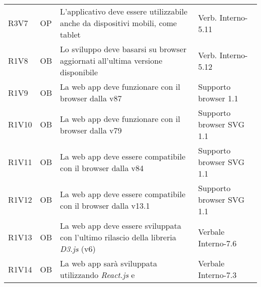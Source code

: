 {\begin{longtable}{C{2cm} | C{1.5cm} | C{9cm} | C{3.3cm}}
R3V7 & OP & L'applicativo deve essere utilizzabile anche da dispositivi mobili, come tablet & Verb. Interno-5.11\\
R1V8 & OB & Lo sviluppo deve basarsi su browser aggiornati all'ultima versione disponibile & Verb. Interno-5.12\\
R1V9 & OB & La web app deve funzionare con il browser  dalla v87 & Supporto browser  1.1 \\
R1V10 & OB & La web app deve funzionare con il browser  dalla v79 & Supporto browser SVG 1.1 \\
R1V11 & OB & La web app deve essere compatibile con il browser  dalla v84 & Supporto browser SVG 1.1\\
R1V12 & OB & La web app deve essere compatibile con il browser  dalla v13.1 & Supporto browser SVG 1.1\\
R1V13 & OB & La web app deve essere sviluppata con l'ultimo rilascio della libreria \textit{D3.js} (v6) & Verbale Interno-7.6\\
R1V14 & OB & La web app sarà sviluppata utilizzando \textit{React.js} e \textit{} & Verbale Interno-7.3\\

\end{longtable}
}